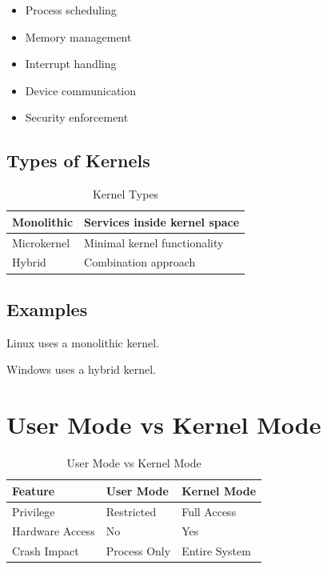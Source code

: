 \begin{itemize}
\item Process scheduling
\item Memory management
\item Interrupt handling
\item Device communication
\item Security enforcement
\end{itemize}

\subsection{Types of Kernels}

\begin{table}[H]
\centering
\begin{tabular}{|p{3cm}|p{8cm}|}
\hline
Monolithic & Services inside kernel space \\
\hline
Microkernel & Minimal kernel functionality \\
\hline
Hybrid & Combination approach \\
\hline
\end{tabular}
\caption{Kernel Types}
\end{table}

\subsection{Examples}

Linux uses a monolithic kernel.

Windows uses a hybrid kernel.

\section{User Mode vs Kernel Mode}

\begin{table}[H]
\centering
\begin{tabular}{|p{4cm}|p{5cm}|p{5cm}|}
\hline
Feature & User Mode & Kernel Mode \\
\hline
Privilege & Restricted & Full Access \\
\hline
Hardware Access & No & Yes \\
\hline
Crash Impact & Process Only & Entire System \\
\hline
\end{tabular}
\caption{User Mode vs Kernel Mode}
\end{table}


